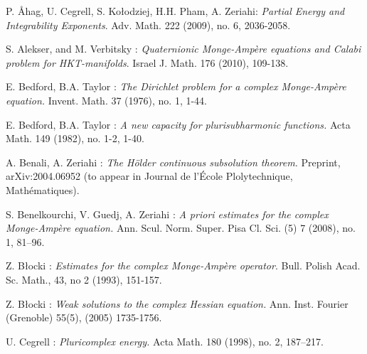 \documentclass[12pt]{amsart}
\theoremstyle{definition}
\numberwithin{theorem}{section}
\numberwithin{equation}{section}
\begin{document}
{ \begin{thebibliography}{X-XX}
 
   P. {\AA}hag, U. Cegrell, S. Ko\l odziej, H.H. Pham, A. Zeriahi: {\it Partial Energy and Integrability Exponents}. Adv. Math. 222 (2009), no. 6, 2036-2058. 
 
  S. Alekser, and M. Verbitsky : {\it Quaternionic Monge-Amp\`ere equations and Calabi problem
for HKT-manifolds}. Israel J. Math. 176 (2010), 109-138.

  E. Bedford, B.A.  Taylor : {\it  The Dirichlet problem for a complex Monge-Amp\`ere equation.} Invent. Math. 37 (1976), no. 1, 1-44.
 
  E. Bedford, B.A.  Taylor : {\it  A new capacity for plurisubharmonic functions.} Acta Math. 149 (1982), no. 1-2, 1-40. 
 
  A. Benali, A. Zeriahi : {\it  The H\"older continuous subsolution theorem.} Preprint,  arXiv:2004.06952 (to appear in Journal de l'\'Ecole Plolytechnique, Math\'ematiques). 
 
   S. Benelkourchi, V. Guedj,  A. Zeriahi : {\it  A priori estimates for the complex Monge-Amp\`ere equation.} Ann.  Scul. Norm. Super. Pisa Cl. Sci. (5) 7 (2008), no. 1, 81–96. 
  
  
 
  {Z. B\l ocki} : {\it Estimates for the complex Monge-Amp\`ere operator}. Bull. Polish Acad. Sc. Math., 43, no 2 (1993), 151-157.
 
 {Z. B\l ocki} : {\it  Weak solutions to the complex Hessian equation.}  Ann. Inst. Fourier (Grenoble) 55(5), (2005) 1735-1756.


 {U. Cegrell} : {\it Pluricomplex energy.} Acta Math. 180 (1998), no. 2, 187–217. 


\end{thebibliography}}
\end{document}
